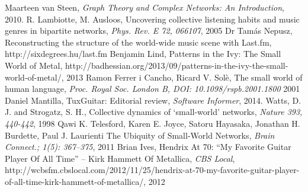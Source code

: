\documentclass{llncs}
\begin{document}
\begin{thebibliography}{50}
		Maarteen van Steen, 
		\textsl{Graph Theory and Complex Networks: An Introduction}, 
		2010.
		R. Lambiotte, M. Ausloos,
		Uncovering collective listening habits and music genres in bipartite networks,
		\textsl{Phys. Rev. E 72, 066107},
		2005
		Dr Tamás Nepusz,
		Reconstructing the structure of the world-wide music scene with Last.fm,
		http://sixdegrees.hu/last.fm
		Benjamin Lind,
		Patterns in the Ivy: The Small World of Metal,
		http://badhessian.org/2013/09/patterns-in-the-ivy-the-small-world-of-metal/,
		2013
		Ramon Ferrer i Cancho, Ricard V. Solè,
		The small world of human language,
		\textsl{Proc. Royal Soc. London B, DOI: 10.1098/rspb.2001.1800}
		2001
		Daniel Mantilla,
		TuxGuitar: Editorial review,
		\textsl{Software Informer},
		2014.
		Watts, D. J. and Strogatz, S. H.,
		Collective dynamics of `small-world’ networks,
		\textsl{Nature 393, 440-442},
		1998
		Qawi K. Telesford, Karen E. Joyce, Satoru Hayasaka, Jonathan H. Burdette, Paul J. Laurienti
		The Ubiquity of Small-World Networks,
		\textsl{Brain Connect.; 1(5): 367–375},
		2011
		Brian Ives,
		Hendrix At 70: “My Favorite Guitar Player Of All Time” – Kirk Hammett Of Metallica,
		\textsl{CBS Local},
		http://wcbsfm.cbslocal.com/2012/11/25/hendrix-at-70-my-favorite-guitar-player-of-all-time-kirk-hammett-of-metallica/,
		2012
	\end{thebibliography}
\end{document}
